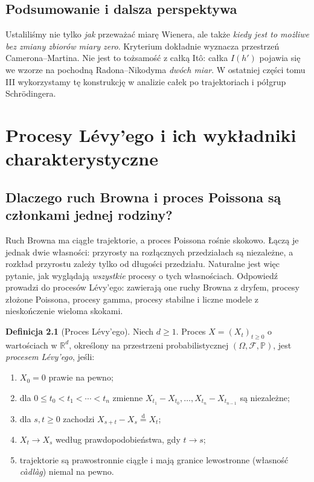 \documentclass[11pt,a4paper,oneside]{report}
\numberwithin{equation}{chapter}
\theoremstyle{plain}
\theoremstyle{definition}
\newtheorem{definicja}{Definicja}[chapter]
\theoremstyle{remark}
\newcommand{\R}{\mathbb{R}}
\newcommand{\Prob}{\mathbb{P}}
\newcommand{\calF}{\mathcal{F}}
\begin{document}
\section{Podsumowanie i dalsza perspektywa}
Ustaliliśmy nie tylko \emph{jak} przeważać miarę Wienera,
ale także \emph{kiedy jest to możliwe bez zmiany zbiorów miary zero}.
Kryterium dokładnie wyznacza przestrzeń Camerona--Martina.
Nie jest to tożsamość z całką Itô: całka $I(h')$ pojawia się
we wzorze na pochodną Radona--Nikodyma \emph{dwóch miar}.
W ostatniej części tomu III wykorzystamy tę konstrukcję
w analizie całek po trajektoriach i półgrup Schrödingera.

\chapter{Procesy Lévy'ego i ich wykładniki charakterystyczne}
\label{ch:levy}

\section{Dlaczego ruch Browna i proces Poissona są członkami jednej rodziny?}

Ruch Browna ma ciągłe trajektorie, a proces Poissona rośnie
skokowo. Łączą je jednak dwie własności: przyrosty na rozłącznych
przedziałach są niezależne, a rozkład przyrostu zależy tylko od
długości przedziału. Naturalne jest więc pytanie, jak wyglądają
\emph{wszystkie} procesy o tych własnościach.
Odpowiedź prowadzi do procesów Lévy'ego: zawierają one
ruchy Browna z dryfem, procesy złożone Poissona, procesy gamma,
procesy stabilne i liczne modele z nieskończenie wieloma skokami.

\begin{definicja}[Proces Lévy'ego]
\label{def:levy}
Niech $d\ge1$. Proces $X=(X_t)_{t\ge0}$ o wartościach w
$\R^d$, określony na przestrzeni probabilistycznej
$(\Omega,\calF,\Prob)$, jest \emph{procesem Lévy'ego}, jeśli:
\begin{enumerate}
\item $X_0=0$ prawie na pewno;
\item dla $0\le t_0<t_1<\cdots<t_n$ zmienne
$X_{t_1}-X_{t_0},\ldots,X_{t_n}-X_{t_{n-1}}$ są niezależne;
\item dla $s,t\ge0$ zachodzi
$X_{s+t}-X_s\overset{\mathrm d}=X_t$;
\item $X_t\to X_s$ według prawdopodobieństwa, gdy $t\to s$;
\item trajektorie są prawostronnie ciągłe i mają granice lewostronne
(własność \emph{càdlàg}) niemal na pewno.
\end{enumerate}
\end{definicja}
\end{document}

